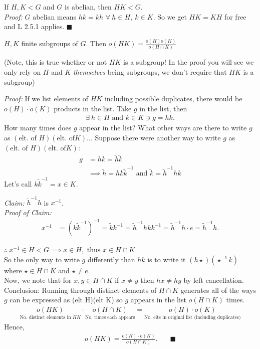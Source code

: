\setcounter{dummy_lemma}{0}
\begin{corollary}
If $H,K < G$ and $G$ is abelian, then $HK<G$.\\
\textit{Proof:}
$G$ abelian means $hk=kh$ $\forall \ h\in H, \ k\in K$. So we get $HK=KH$ for free and L 2.5.1
applies. $\blacksquare$
\end{corollary}

\begin{theorem}
$H, K$ finite subgroups of $G$. Then $o(HK)= \frac{o(H)o(K)}{o(H\cap K)}$ \steezybreak

\noindent (Note, this is true whether or not $HK$ is a subgroup! In the proof you will see we only
rely on $H$ and $K$ \textit{themselves} being subgroups, we don't require that $HK$ is a subgroup)
\steezybreak

\noindent \textit{Proof:} If we list elements of $HK$ including possible duplicates, there would be
$o(H)\cdot o(K)$ products in the list. Take $g$ in the list, then
\begin{align}
    \exists \ h\in H \text{ and } k\in K \ni g=hk.\nonumber
\end{align}
How many times does $g$ appear in the list? What other ways are there to write $g$ as
$(\text{elt. of }H)(\text{elt. of} K)$... Suppose there were another way to write $g$ as
$(\text{elt. of }H)(\text{elt. of} K)$:
\begin{align}
    g&=hk=\tilde{h}\tilde{k} \nonumber \\
    &\implies \tilde{h}=hk\tilde{k}^{-1}  \text{ and } \tilde{k}=\tilde{h}^{-1}hk \nonumber
\end{align}
Let's call $k\tilde{k}^{-1} =x \in K$. \steezybreak

\noindent \textit{Claim:} $\tilde{h}^{-1}h$ is $x^{-1}$.\\
\textit{Proof of Claim:}
\begin{align}
    x^{-1}&=(k\tilde{k}^{-1})^{-1}= \tilde{k}k^{-1}=\tilde{h}^{-1}hkk^{-1}=\tilde{h}^{-1}h\cdot e=\tilde{h}^{-1}h. \nonumber
\end{align}\steezybreak

\noindent $\therefore \ x^{-1} \in H < G \implies x \in H, \text{ thus } x\in H\cap K $ \\
So the only way to write $g$ differently than $hk$ is to write it $(h \star)(\star^{-1}k)$ where
$\star \in H \cap K$ and $\star \neq e$. \\
Now, we note that for $x,y \in H\cap K$ if $x\neq y$ then $hx\neq hy$ by left cancellation. \\
Conclusion: Running through distinct elements of $H\cap K$ generates all of the ways $g$ can be
expressed as (elt H)(elt K) so $g$ appears in the list $o(H\cap K)$ times.
\begin{align}
    \underset{\text{No. distinct elements in $HK$}}{o(HK)}\cdot \underset{\text{No. times each appears}}{o(H\cap K)}= \underset{\text{No. elts in original list (including duplicates)}}{o(H)\cdot o(K)} \nonumber
\end{align}
Hence,
\begin{align}
    o(HK)=\frac{o(H)\cdot o(K)}{o(H\cap K)}. \ \ \ \ \ \ \ \ \blacksquare \nonumber
\end{align}
\end{theorem}
